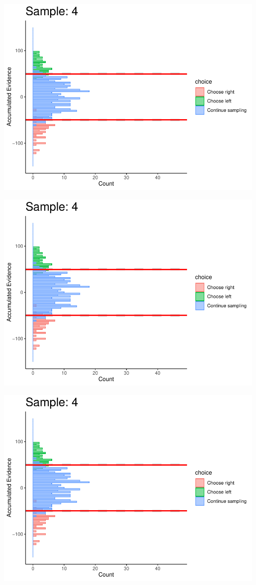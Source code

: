 \documentclass[
]{book}
\begin{document}
\begin{center}\includegraphics[width=0.8\linewidth]{LateNightBayes_files/figure-latex/fixed_dcb-31} \end{center}

\begin{center}\includegraphics[width=0.8\linewidth]{LateNightBayes_files/figure-latex/fixed_dcb-32} \end{center}

\begin{center}\includegraphics[width=0.8\linewidth]{LateNightBayes_files/figure-latex/fixed_dcb-33} \end{center}
\end{document}
